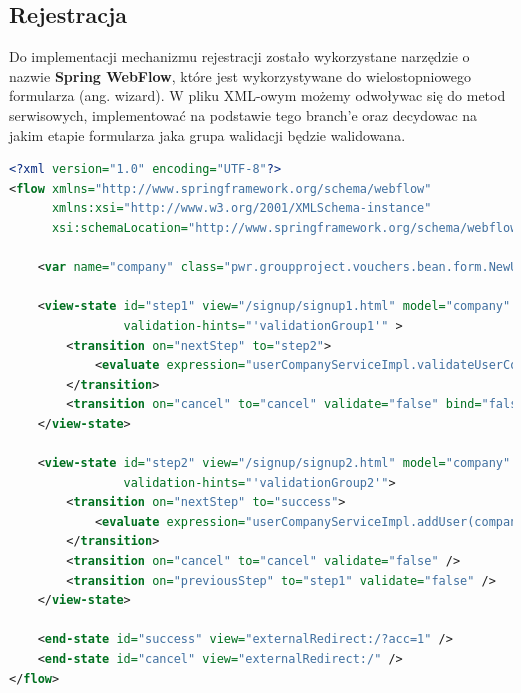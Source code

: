 \documentclass[a4paper]{article}
\begin{document}
\subsection{Rejestracja}
Do implementacji mechanizmu rejestracji zostało wykorzystane narzędzie o nazwie \textbf{Spring WebFlow}, które jest wykorzystywane do wielostopniowego formularza (ang. wizard). W pliku XML-owym możemy odwoływac się do metod serwisowych, implementować na podstawie tego branch'e oraz decydowac na jakim etapie formularza jaka grupa walidacji będzie walidowana.
\begin{lstlisting}[language=XML,tabsize=2,frame=single,breaklines=true]
<?xml version="1.0" encoding="UTF-8"?>
<flow xmlns="http://www.springframework.org/schema/webflow"
      xmlns:xsi="http://www.w3.org/2001/XMLSchema-instance"
      xsi:schemaLocation="http://www.springframework.org/schema/webflow http://www.springframework.org/schema/webflow/spring-webflow-2.4.xsd">

    <var name="company" class="pwr.groupproject.vouchers.bean.form.NewUserCompanyForm"/>

    <view-state id="step1" view="/signup/signup1.html" model="company"
                validation-hints="'validationGroup1'" >
        <transition on="nextStep" to="step2">
            <evaluate expression="userCompanyServiceImpl.validateUserCompany(company,messageContext)" />
        </transition>
        <transition on="cancel" to="cancel" validate="false" bind="false" />
    </view-state>

    <view-state id="step2" view="/signup/signup2.html" model="company"
                validation-hints="'validationGroup2'">
        <transition on="nextStep" to="success">
            <evaluate expression="userCompanyServiceImpl.addUser(company)" />
        </transition>
        <transition on="cancel" to="cancel" validate="false" />
        <transition on="previousStep" to="step1" validate="false" />
    </view-state>

    <end-state id="success" view="externalRedirect:/?acc=1" />
    <end-state id="cancel" view="externalRedirect:/" />
</flow>
\end{lstlisting}
\end{document}
